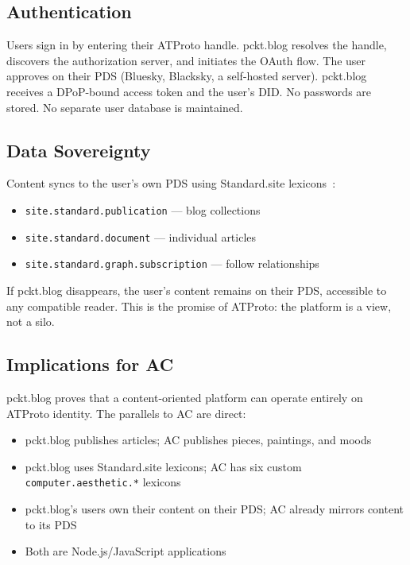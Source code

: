 \documentclass[10pt,letterpaper,twocolumn]{article}
\begin{document}
\subsection{Authentication}

Users sign in by entering their ATProto handle. pckt.blog resolves the handle, discovers the authorization server, and initiates the OAuth flow. The user approves on their PDS (Bluesky, Blacksky, a self-hosted server). pckt.blog receives a DPoP-bound access token and the user's DID. No passwords are stored. No separate user database is maintained.

\subsection{Data Sovereignty}

Content syncs to the user's own PDS using Standard.site lexicons~\citep{standardsite2025}:

\begin{itemize}
  \item \texttt{site.standard.publication} --- blog collections
  \item \texttt{site.standard.document} --- individual articles
  \item \texttt{site.standard.graph.subscription} --- follow relationships
\end{itemize}

If pckt.blog disappears, the user's content remains on their PDS, accessible to any compatible reader. This is the promise of ATProto: the platform is a view, not a silo.

\subsection{Implications for AC}

pckt.blog proves that a content-oriented platform can operate entirely on ATProto identity. The parallels to AC are direct:

\begin{itemize}
  \item pckt.blog publishes articles; AC publishes pieces, paintings, and moods
  \item pckt.blog uses Standard.site lexicons; AC has six custom \texttt{computer.aesthetic.*} lexicons
  \item pckt.blog's users own their content on their PDS; AC already mirrors content to its PDS
  \item Both are Node.js/JavaScript applications
\end{itemize}
\end{document}
